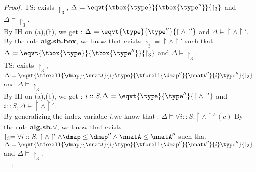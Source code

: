 \begin{proof}
TS: exists $\restriction_3$, $ \Delta \models \eqvt{ \tbox{\type}   }{ \tbox{\type''}
  }{\restriction_3 } $ and $ \Delta \models \restriction_3 $.\\
By IH on (a),(b), we get : $ \Delta \models \eqvt{ \type  }{ \type'' 
  }{\restriction \land \restriction' } $ and $ \Delta \models \restriction \land \restriction'$.\\
  By the rule \textbf{alg-sb-box}, we know that exists $\restriction_3 = \restriction \land \restriction'  $ such that $ \Delta \models \eqvt{ \tbox{\type} }{\tbox{\type''} 
  }{\restriction_3 } $ and $ \Delta \models \restriction_3 $.\\
  
TS: exists $\restriction_3$, $ \Delta \models \eqvt{ \tforall{\dmap}{\nnatA}{i} \type   }{ \tforall{\dmap''}{\nnatA''}{i} \type''
  }{\restriction_3 } $ and $ \Delta \models \restriction_3 $.\\
 By IH on (a),(b), we get : $ i::S, \Delta \models \eqvt{ \type  }{ \type'' 
  }{\restriction \land \restriction' } $ and $ i::S, \Delta \models \restriction \land \restriction'$.\\
  By generalizing the index variable $i$,we know that : $ \Delta \models \forall i::S. \restriction \land \restriction'~(c)$
  By the rule \textbf{alg-sb-$\forall$}, we know that exists $\restriction_3 = \forall i::S.\restriction \land \restriction' \land \dmap \leq \dmap'' \land \nnatA \leq \nnatA'' $ such that $ \Delta \models \eqvt{ \tforall{\dmap}{\nnatA}{i} \type }{ \tforall{\dmap''}{\nnatA''}{i} \type'' 
  }{\restriction_3 } $ and $ \Delta \models \restriction_3 $.\\
  
\end{proof}

